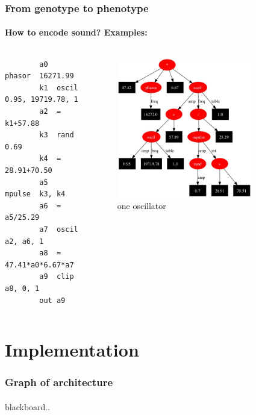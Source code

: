 \documentclass{beamer}
\begin{document}
\begin{frame}[fragile]
	\frametitle{From genotype to phenotype}
	\framesubtitle{How to encode sound? Examples:}
	
	\begin{columns}[t] 
		\begin{lstlisting}
		a0	phasor	16271.99
		k1	oscil	0.95, 19719.78, 1
		a2	=	k1+57.88
		k3	rand	0.69
		k4	=	28.91+70.50
		a5	mpulse	k3, k4
		a6	=	a5/25.29
		a7	oscil	a2, a6, 1
		a8	=	47.41*a0*6.67*a7
		a9	clip	a8, 0, 1
		out	a9
		\end{lstlisting}
		
		\begin{figure}[h]
			\centering
				\includegraphics[width=0.8\textwidth]{images/large_graph.jpg}
			\caption{one oscillator}
			\label{sg:fig:images_one_oscil}
		\end{figure}
	\end{columns}
\end{frame}





\section{Implementation} %

\begin{frame}
	\frametitle{Graph of architecture}
	\framesubtitle{}
	blackboard..
\end{frame}
\end{document}
